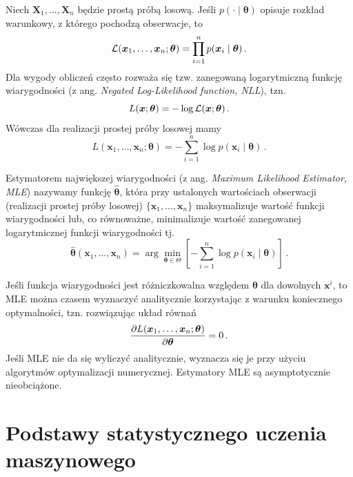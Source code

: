 \documentclass{myclass}
\numberwithin{equation}{subsection}
\begin{document}
Niech \(\bm{X}_1,\ldots,\bm{X}_n\) będzie prostą próbą losową. Jeśli \(p(\cdot \mid \bm{\theta})\)
opisuje rozkład warunkowy, z którego pochodzą obserwacje, to
\begin{equation}
    \mathcal{L}(\bm{x}_1,\ldots,\bm{x}_n;\bm{\theta}) = \prod_{i=1}^n p(\bm{x}_i \mid \bm{\theta})\,.
\end{equation}
Dla wygody obliczeń często rozważa się tzw. zanegowaną logarytmiczną funkcję wiarygodności (z ang.
\textit{Negated Log-Likelihood function, NLL}), tzn.
\begin{equation}
    L(\bm{x};\bm{\theta}) = - \log \mathcal{L}(\bm{x};\bm{\theta})\,.
\end{equation}
Wówczas dla realizacji prostej próby losowej mamy
\begin{equation}
    L(\bm{x}_1,\ldots,\bm{x}_n;\bm{\theta}) = -\sum_{i=1}^n \log p(\bm{x}_i \mid \bm{\theta})\,.
\end{equation}

\begin{definition}
Estymatorem największej wiarygodności (z ang. \textit{Maximum Likelihood Estimator, MLE}) nazywamy
funkcję \(\bm{\hat{\theta}}\), która przy ustalonych wartościach obserwacji (realizacji prostej
próby losowej) \(\{\bm{x}_1,\ldots,\bm{x}_n\}\) maksymalizuje wartość funkcji wiarygodności lub, co
równoważne, minimalizuje wartość zanegowanej logarytmicznej funkcji wiarygodności tj.
\begin{equation*}
    \bm{\hat \theta}(\bm{x}_1,\ldots,\bm{x}_n) = \arg \min_{\bm{\theta} \in \Theta} \left[- \sum_{i=1}^n \log p(\bm{x}_i \mid \bm{\theta})\right]\,.
\end{equation*}
\end{definition}
    
Jeśli funkcja wiarygodności jest różniczkowalna względem \(\bm{\theta}\) dla dowolnych \(\bm{x}^i\),
to MLE można czasem wyznaczyć analitycznie korzystając z warunku koniecznego optymalności, tzn.
rozwiązując układ równań
\begin{equation}
    \pdv{L(\bm{x}_1,\ldots,\bm{x}_n; \bm{\theta})}{\bm{\theta}} = 0\,.
\end{equation}
Jeśli MLE nie da się wyliczyć analitycznie, wyznacza się je przy użyciu algorytmów optymalizacji
numerycznej. Estymatory MLE są asymptotycznie nieobciążone.


\section{Podstawy statystycznego uczenia maszynowego}
\end{document}
